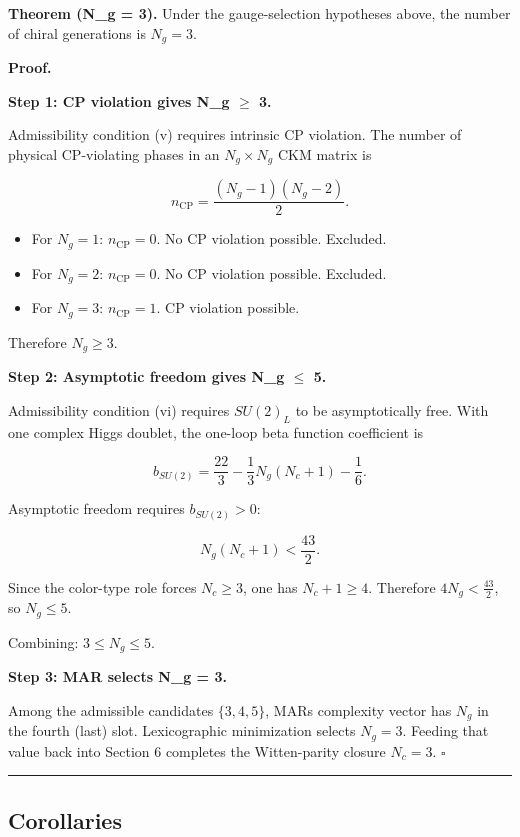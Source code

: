 \textbf{Theorem (N\_g = 3).} Under the gauge-selection hypotheses above, the number of chiral generations is \(N_g = 3\).

\textbf{Proof.}

\textbf{Step 1: CP violation gives N\_g \ensuremath{\geq} 3.}

Admissibility condition (v) requires intrinsic CP violation. The number of physical CP-violating phases in an \(N_g \times N_g\) CKM matrix is

\[n_{\mathrm{CP}} = \frac{(N_g - 1)(N_g - 2)}{2}.\]

\begin{itemize}
\tightlist
\item
  For \(N_g = 1\): \(n_{\mathrm{CP}} = 0\). No CP violation possible. Excluded.
\item
  For \(N_g = 2\): \(n_{\mathrm{CP}} = 0\). No CP violation possible. Excluded.
\item
  For \(N_g = 3\): \(n_{\mathrm{CP}} = 1\). CP violation possible.
\end{itemize}

Therefore \(N_g \geq 3\).

\textbf{Step 2: Asymptotic freedom gives N\_g \ensuremath{\leq} 5.}

Admissibility condition (vi) requires \(SU(2)_L\) to be asymptotically free. With one complex Higgs doublet, the one-loop beta function coefficient is

\[b_{SU(2)} = \frac{22}{3} - \frac{1}{3}N_g(N_c + 1) - \frac{1}{6}.\]

Asymptotic freedom requires \(b_{SU(2)} > 0\):

\[N_g(N_c + 1) < \frac{43}{2}.\]

Since the color-type role forces \(N_c \ge 3\), one has \(N_c + 1 \ge 4\). Therefore \(4N_g < \frac{43}{2}\), so \(N_g \leq 5\).

Combining: \(3 \leq N_g \leq 5\).

\textbf{Step 3: MAR selects N\_g = 3.}

Among the admissible candidates \(\{3, 4, 5\}\), MAR\textquotesingle s complexity vector has \(N_g\) in the fourth (last) slot. Lexicographic minimization selects \(N_g = 3\). Feeding that value back into Section 6 completes the Witten-parity closure \(N_c = 3\). \(\square\)

\begin{center}\rule{0.5\linewidth}{0.5pt}\end{center}

\subsection{Corollaries}\label{8-corollaries}


